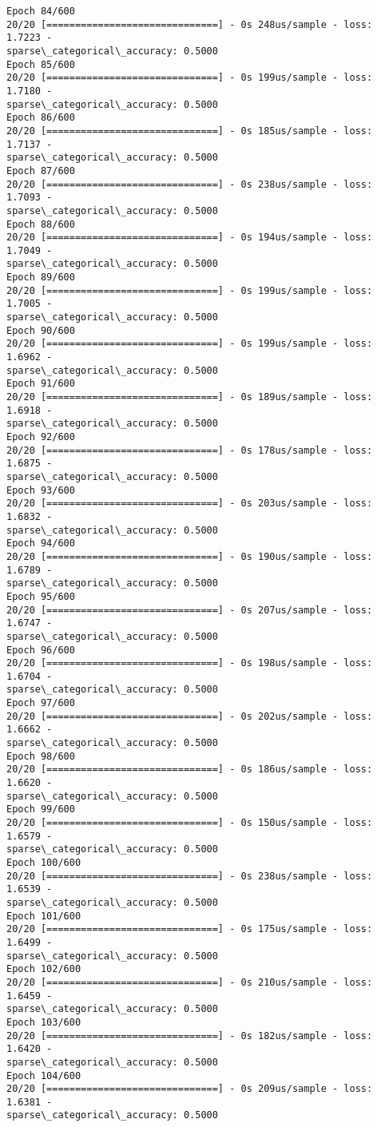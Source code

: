 \documentclass[11pt]{article}
\begin{document}
\begin{Verbatim}[commandchars=\\\{\}]
Epoch 84/600
20/20 [==============================] - 0s 248us/sample - loss: 1.7223 -
sparse\_categorical\_accuracy: 0.5000
Epoch 85/600
20/20 [==============================] - 0s 199us/sample - loss: 1.7180 -
sparse\_categorical\_accuracy: 0.5000
Epoch 86/600
20/20 [==============================] - 0s 185us/sample - loss: 1.7137 -
sparse\_categorical\_accuracy: 0.5000
Epoch 87/600
20/20 [==============================] - 0s 238us/sample - loss: 1.7093 -
sparse\_categorical\_accuracy: 0.5000
Epoch 88/600
20/20 [==============================] - 0s 194us/sample - loss: 1.7049 -
sparse\_categorical\_accuracy: 0.5000
Epoch 89/600
20/20 [==============================] - 0s 199us/sample - loss: 1.7005 -
sparse\_categorical\_accuracy: 0.5000
Epoch 90/600
20/20 [==============================] - 0s 199us/sample - loss: 1.6962 -
sparse\_categorical\_accuracy: 0.5000
Epoch 91/600
20/20 [==============================] - 0s 189us/sample - loss: 1.6918 -
sparse\_categorical\_accuracy: 0.5000
Epoch 92/600
20/20 [==============================] - 0s 178us/sample - loss: 1.6875 -
sparse\_categorical\_accuracy: 0.5000
Epoch 93/600
20/20 [==============================] - 0s 203us/sample - loss: 1.6832 -
sparse\_categorical\_accuracy: 0.5000
Epoch 94/600
20/20 [==============================] - 0s 190us/sample - loss: 1.6789 -
sparse\_categorical\_accuracy: 0.5000
Epoch 95/600
20/20 [==============================] - 0s 207us/sample - loss: 1.6747 -
sparse\_categorical\_accuracy: 0.5000
Epoch 96/600
20/20 [==============================] - 0s 198us/sample - loss: 1.6704 -
sparse\_categorical\_accuracy: 0.5000
Epoch 97/600
20/20 [==============================] - 0s 202us/sample - loss: 1.6662 -
sparse\_categorical\_accuracy: 0.5000
Epoch 98/600
20/20 [==============================] - 0s 186us/sample - loss: 1.6620 -
sparse\_categorical\_accuracy: 0.5000
Epoch 99/600
20/20 [==============================] - 0s 150us/sample - loss: 1.6579 -
sparse\_categorical\_accuracy: 0.5000
Epoch 100/600
20/20 [==============================] - 0s 238us/sample - loss: 1.6539 -
sparse\_categorical\_accuracy: 0.5000
Epoch 101/600
20/20 [==============================] - 0s 175us/sample - loss: 1.6499 -
sparse\_categorical\_accuracy: 0.5000
Epoch 102/600
20/20 [==============================] - 0s 210us/sample - loss: 1.6459 -
sparse\_categorical\_accuracy: 0.5000
Epoch 103/600
20/20 [==============================] - 0s 182us/sample - loss: 1.6420 -
sparse\_categorical\_accuracy: 0.5000
Epoch 104/600
20/20 [==============================] - 0s 209us/sample - loss: 1.6381 -
sparse\_categorical\_accuracy: 0.5000

\end{Verbatim}
\end{document}
